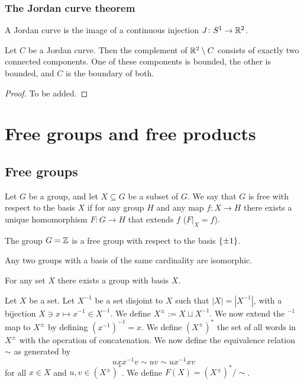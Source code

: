 \documentclass[11pt,a4paper]{article}
\begin{document}
\subsubsection{The Jordan curve theorem}
\begin{definition}
  A Jordan curve is the image of a continuous injection
  $J \colon S^1 \to \mathbb{R}^2$.
\end{definition}
\begin{theorem}
  Let $C$ be a Jordan curve.
  Then the complement of $\mathbb{R}^2 \setminus C$
  consists of exactly two connected components.
  One of these components is bounded, the other is bounded,
  and $C$ is the boundary of both.
\end{theorem}
\begin{proof}
  To be added.
\end{proof}

\newpage

\section{Free groups and free products}

\subsection{Free groups}

\begin{definition}
  Let $G$ be a group, and let $X \subseteq G$ be a subset of $G$.
  We say that $G$ is free with respect to the basis $X$ if for any group
  $H$ and any map $f \colon X \to H$ there exists a unique homomorphism
  $F \colon G \to H$ that extends $f$ ($F\vert_X = f$).
\end{definition}
\begin{example}
  The group $G = \mathbb{Z}$ is a free group with respect to the basis $\left\{\pm 1\right\}$.
\end{example}

\begin{exercise}
  Any two groups with a basis of the same cardinality are isomorphic.
\end{exercise}

\begin{remark}
  For any set $X$ there exists a group with basis $X$.
\end{remark}

\begin{definition}
  Let $X$ be a set.
  Let $X^{-1}$ be a set disjoint to $X$ such that $|X| = |X^{-1}|$,
  with a bijection $X \ni x \mapsto x^{-1} \in X^{-1}$.
  We define $X^{\pm} := X \sqcup X^{-1}$.
  We now extend the $^{-1}$ map to $X^{\pm}$ by defining
  $(x^{-1})^{-1} = x$.
  We define $(X^{\pm})^*$ the set of all words in $X^{\pm}$ with the operation
  of concatenation.
  We now define the equivalence relation $\sim$ as generated by
  \[
    u x x^{-1} v \sim u v \sim u x^{-1} x v
  \]
  for all $x \in X$ and $u,v \in (X^{\pm})^*$.
  We define $F(X) = (X^{\pm})^* / \sim$.
\end{definition}
\end{document}
